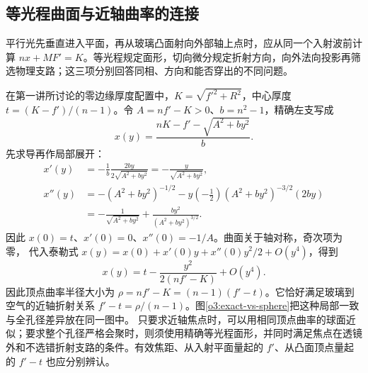 \subsection{等光程曲面与近轴曲率的连接}

平行光先垂直进入平面，再从玻璃凸面射向外部轴上点时，应从同一个入射波前计算 $nx+MF'=K$。等光程规定面形，切向微分规定折射方向，向外法向投影再筛选物理支路；这三项分别回答同相、方向和能否穿出的不同问题。

在第一讲所讨论的零边缘厚度配置中，$K=\sqrt{f'^2+R^2}$，中心厚度 $t=(K-f')/(n-1)$。令 $A=nf'-K>0$、$b=n^2-1$，精确左支写成
\[
 x(y)=\frac{nK-f'-\sqrt{A^2+by^2}}b.
\]
先求导再作局部展开：
\begin{align*}
 x'(y)&=-\frac1b\frac{2by}{2\sqrt{A^2+by^2}}
       =-\frac y{\sqrt{A^2+by^2}},\\
 x''(y)&=-(A^2+by^2)^{-1/2}
 -y\left(-\frac12\right)(A^2+by^2)^{-3/2}(2by)\\
 &=-\frac1{\sqrt{A^2+by^2}}+\frac{by^2}{(A^2+by^2)^{3/2}}.
\end{align*}
因此 $x(0)=t$、$x'(0)=0$、$x''(0)=-1/A$。曲面关于轴对称，奇次项为零，
代入泰勒式 $x(y)=x(0)+x'(0)y+x''(0)y^2/2+O(y^4)$，得到
\[
x(y)=t-\frac{y^2}{2(nf'-K)}+O(y^4).
\]
因此顶点曲率半径大小为 $\rho=nf'-K=(n-1)(f'-t)$。它恰好满足玻璃到空气的近轴折射关系 $f'-t=\rho/(n-1)$。图\ref{o3:exact-vs-sphere}把这种局部一致与全孔径差异放在同一图中。
只要求近轴焦点时，可以用相同顶点曲率的球面近似；要求整个孔径严格会聚时，则须使用精确等光程面形，并同时满足焦点在透镜外和不选错折射支路的条件。有效焦距、从入射平面量起的 $f'$、从凸面顶点量起的 $f'-t$ 也应分别辨认。
